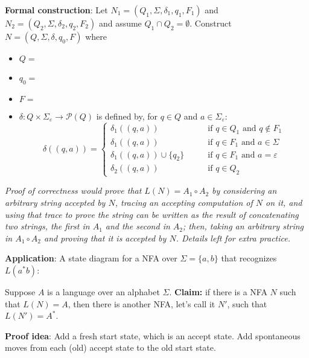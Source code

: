 \documentclass[12pt, oneside]{article}
\begin{document}
{\bf Formal construction}: Let 
$N_1 = (Q_1, \Sigma, \delta_1, q_1, F_1)$ and $N_2 = (Q_2, \Sigma, \delta_2,q_2, F_2)$
and assume $Q_1 \cap Q_2 = \emptyset$.
Construct $N = (Q, \Sigma, \delta, q_0, F)$ where
\begin{itemize}
    \item $Q = $
    \item $q_0 = $
    \item $F = $
    \item $\delta: Q \times \Sigma_\varepsilon \to \mathcal{P}(Q)$ is defined by, for $q \in Q$ and $a \in \Sigma_{\varepsilon}$:
        \[
            \delta((q,a))=\begin{cases}  
                \delta_1 ((q,a)) &\qquad\text{if } q\in Q_1 \textrm{ and } q \notin F_1\\ 
                \delta_1 ((q,a)) &\qquad\text{if } q\in F_1 \textrm{ and } a \in \Sigma\\ 
                \delta_1 ((q,a)) \cup \{q_2\} &\qquad\text{if } q\in F_1 \textrm{ and } a = \varepsilon\\ 
                \delta_2 ((q,a)) &\qquad\text{if } q\in Q_2
            \end{cases}
        \]
\end{itemize}

\vfill

{\it Proof of correctness would prove that $L(N) = A_1 \circ A_2$ by considering
an arbitrary string accepted by $N$, tracing an accepting computation of $N$ on it, and using 
that trace to prove the string can be written as the result of concatenating two strings, 
the first in $A_1$ and the second in $A_2$; then, taking an arbitrary 
string in $A_1 \circ A_2$ and proving that it is accepted by $N$. Details left for extra practice.}

\vfill
{\bf Application}: A state diagram for a NFA over $\Sigma = \{a,b\}$ 
that recognizes $L ( a^*b)$:


\newpage



Suppose $A$ is a language over an alphabet $\Sigma$.
{\bf Claim:} if there is a NFA $N$ such that $L(N) = A$, then there is another NFA, let's call it $N'$, such that 
$L(N') = A^*$.

{\bf Proof idea}: Add a fresh start state, which is an accept state. Add spontaneous 
moves from each (old) accept state to the old start state.
\end{document}
